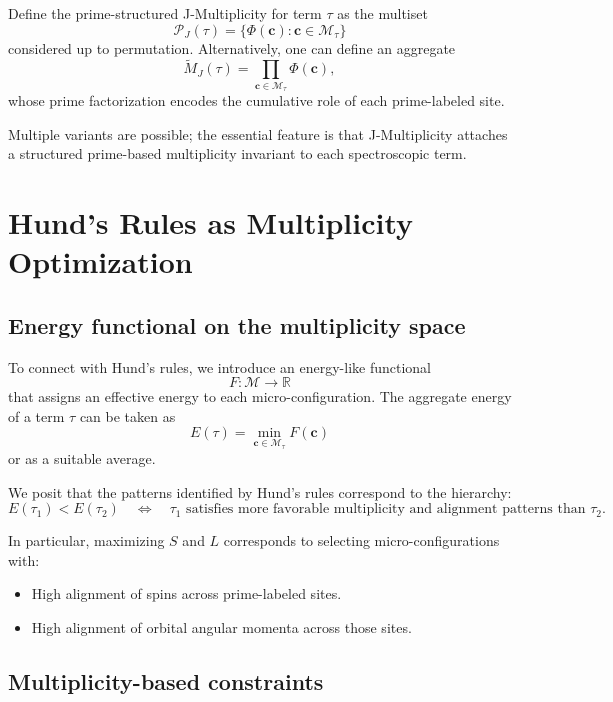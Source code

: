 \documentclass[11pt]{article}
\begin{document}
\begin{definition}
Define the prime-structured J-Multiplicity for term \(\tau\) as the multiset
\[
\mathcal{P}_J(\tau) = \{\Phi(\mathbf{c}) : \mathbf{c} \in \mathcal{M}_\tau\}
\]
considered up to permutation. Alternatively, one can define an aggregate
\[
\widetilde{M}_J(\tau) = \prod_{\mathbf{c} \in \mathcal{M}_\tau} \Phi(\mathbf{c}),
\]
whose prime factorization encodes the cumulative role of each prime-labeled site.
\end{definition}

Multiple variants are possible; the essential feature is that J-Multiplicity attaches a structured prime-based multiplicity invariant to each spectroscopic term.

\section{Hund's Rules as Multiplicity Optimization}

\subsection{Energy functional on the multiplicity space}

To connect with Hund's rules, we introduce an energy-like functional
\[
F : \mathcal{M} \to \mathbb{R}
\]
that assigns an effective energy to each micro-configuration. The aggregate energy of a term \(\tau\) can be taken as
\[
E(\tau) = \min_{\mathbf{c} \in \mathcal{M}_\tau} F(\mathbf{c})
\]
or as a suitable average.

We posit that the patterns identified by Hund's rules correspond to the hierarchy:
\[
E(\tau_1) < E(\tau_2) \quad \Leftrightarrow \quad \tau_1 \text{ satisfies more favorable multiplicity and alignment patterns than } \tau_2.
\]

In particular, maximizing \(S\) and \(L\) corresponds to selecting micro-configurations with:
\begin{itemize}
  \item High alignment of spins across prime-labeled sites.
  \item High alignment of orbital angular momenta across those sites.
\end{itemize}

\subsection{Multiplicity-based constraints}
\end{document}
